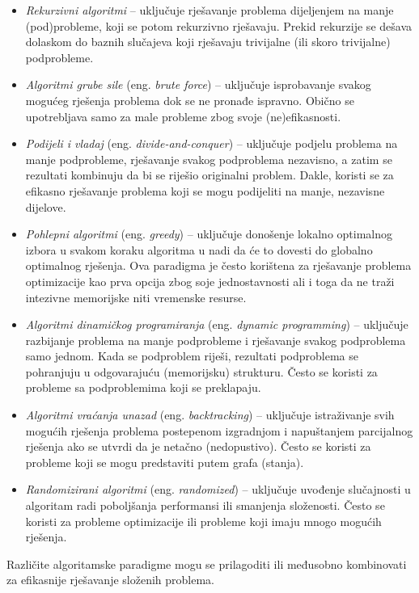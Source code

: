 \begin{itemize}
	\item \textit{Rekurzivni algoritmi} --  uključuje rješavanje problema dijeljenjem na manje (pod)probleme, koji se potom rekurzivno rješavaju. Prekid rekurzije se dešava dolaskom do baznih slučajeva koji rješavaju trivijalne (ili skoro trivijalne) podprobleme. 
	\item \textit{Algoritmi grube sile} (eng.\textit{ brute force}) -- uključuje isprobavanje svakog mogućeg rješenja problema dok se ne pronađe ispravno. Obično se upotrebljava samo za male probleme zbog svoje (ne)efikasnosti.
    \item \textit{ Podijeli i vladaj} (eng. \textit{divide-and-conquer}) --  uključuje podjelu problema na manje podprobleme, rješavanje svakog podproblema nezavisno, a zatim se rezultati  kombinuju da bi se riješio originalni problem. Dakle,  koristi se za efikasno rješavanje problema koji se mogu podijeliti na manje, nezavisne dijelove.
    \item \textit{Pohlepni algoritmi} (eng. \textit{greedy}) --  uključuje donošenje lokalno optimalnog izbora u svakom koraku algoritma u nadi da će to dovesti do globalno optimalnog rješenja. Ova paradigma je često korištena za rješavanje problema optimizacije kao prva opcija zbog soje jednostavnosti ali i toga da ne traži intezivne memorijske niti vremenske resurse. 
    \item \textit{Algoritmi dinamičkog programiranja} (eng. \textit{dynamic programming}) --  uključuje razbijanje problema na manje podprobleme i rješavanje svakog podproblema samo jednom. Kada se podproblem riješi, rezultati podproblema se pohranjuju u odgovarajuću (memorijsku) strukturu.    Često se koristi za probleme sa podproblemima koji se preklapaju.
    \item \textit{Algoritmi vraćanja unazad} (eng. \textit{backtracking}) --  uključuje istraživanje svih mogućih rješenja problema postepenom izgradnjom   i napuštanjem parcijalnog rješenja ako se utvrdi da je netačno (nedopustivo). Često se koristi za probleme koji se mogu predstaviti putem grafa (stanja).
    \item \textit{Randomizirani algoritmi} (eng. \textit{randomized}) --  uključuje uvođenje slučajnosti u algoritam radi poboljšanja performansi ili smanjenja složenosti. Često se koristi za probleme optimizacije ili probleme koji imaju mnogo mogućih rješenja.
\end{itemize}

Različite algoritamske paradigme mogu se   prilagoditi ili međusobno kombinovati za efikasnije rješavanje složenih problema. 

